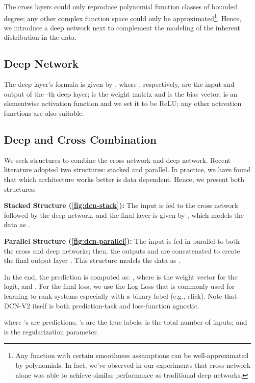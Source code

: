 \documentclass[sigconf]{acmart}
\begin{document}
The cross layers could only reproduce polynomial function classes of bounded degree; any other complex function space could only be approximated\footnote{Any function with certain smoothness assumptions can be well-approximated by polynomials. In fact, we've observed in our experiments that cross network alone was able to achieve similar performance as traditional deep networks.}. Hence, we introduce a deep network next to complement the modeling of the inherent distribution in the data.


\subsection{Deep Network}
The  deep layer's formula is given by
,
where , respectively, are the input and output of the -th deep layer;  is the weight matrix and  is the bias vector;  is an elementwise activation function and we set it to be ReLU; any other activation functions are also suitable.

\subsection{Deep and Cross Combination}
We seek structures to combine the cross network and deep network. Recent literature adopted two structures: stacked and parallel. In practice, we have found that which architecture works better is data dependent. Hence, we present both structures:

{\bf Stacked Structure (\autoref{fig:dcn-stack}):} The input  is fed to the cross network followed by the deep network, and the final layer is given by , which models the data as .


{\bf Parallel Structure (\autoref{fig:dcn-parallel}):} The input  is fed in parallel to both the cross and deep networks; then, the outputs  and  are concatenated to create the final output layer . This structure models the data as .




In the end, the prediction  is computed as:
,
where  is the weight vector for the logit, and . For the final loss, we use the Log Loss that is commonly used for learning to rank systems especially with a binary label (e.g., click). Note that {DCN-V2} itself is both prediction-task and loss-function agnostic.

where 's are predictions; 's are the true labels;  is the total number of inputs; and  is the  regularization parameter. 
\end{document}
